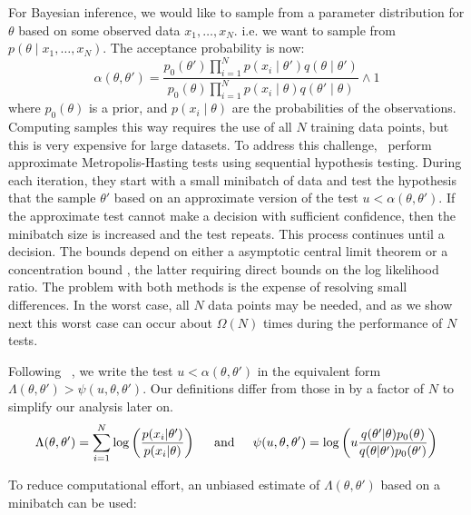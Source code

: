 \documentclass{article}
\begin{document}
For Bayesian inference, we would like to sample from a parameter distribution for $\theta$ based on some
observed data $x_1,\ldots,x_N$. i.e. we want to sample from 
$p(\theta \mid x_1, \ldots, x_N)$. The acceptance probability is now:
\begin{equation}
\alpha(\theta,\theta') = 
 \frac{p_0(\theta')\prod_{i=1}^N p(x_i \mid \theta')q(\theta \mid
\theta')}{p_0(\theta)\prod_{i=1}^N p(x_i \mid \theta)q(\theta' \mid\theta)} \wedge 1
\end{equation}
where $p_0(\theta)$ is a prior, and $p(x_i \mid \theta)$ are the
probabilities of the observations. Computing samples this way requires
the use of all $N$ training data points, but this is very expensive
for large datasets. To address this challenge,~\cite{cutting_mh_2014,icml2014c1_bardenet14} perform
approximate Metropolis-Hasting tests using sequential hypothesis
testing. During each iteration, they start with a small minibatch of
data and test the hypothesis that the sample $\theta'$ based on an
approximate version of the test $u < \alpha(\theta,\theta')$. If the
approximate test cannot make a decision with sufficient confidence,
then the minibatch size is increased and the test repeats. This
process continues until a decision. The bounds depend on either a
asymptotic central limit theorem \cite{cutting_mh_2014} or a
concentration bound \cite{icml2014c1_bardenet14}, the latter requiring
direct bounds on the log likelihood ratio.  The problem with both
methods is the expense of resolving small differences.  In the worst
case, all $N$ data points may be needed, and as we show next this
worst case can occur about $\Omega(N)$ times during the performance of
$N$ tests.

Following ~\cite{icml2014c1_bardenet14}, we write the test $u < \alpha(\theta,\theta')$ in
the equivalent form $\Lambda(\theta,\theta') > \psi(u,\theta,\theta')$. Our definitions differ
from those in \cite{icml2014c1_bardenet14} by a factor of $N$ to simplify our analysis later on. 
\begin{equation}
\Lambda(\theta,\theta') = \sum_{i=1}^N \log\left(\frac{p(x_i|\theta')}{p(x_i|\theta)}\right)  
\hspace{0.2in} {\rm and} \hspace{0.2in}
\psi(u,\theta,\theta') = \log\left(u\frac{q(\theta'|\theta)p_0(\theta)}{q(\theta|\theta')p_0(\theta')}\right)
\end{equation}

To reduce computational effort, an unbiased estimate of $\Lambda(\theta,\theta')$
based on a minibatch can be used:
\end{document}

